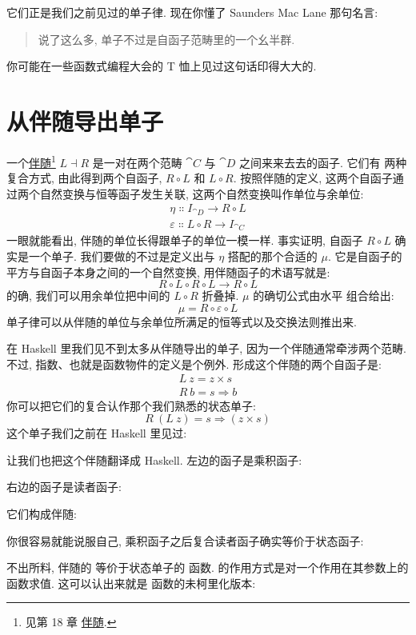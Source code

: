 \noindent
它们正是我们之前见过的单子律. 现在你懂了 Saunders Mac Lane 那句名言:

\begin{quote}
  说了这么多, 单子不过是自函子范畴里的一个幺半群.
\end{quote}
你可能在一些函数式编程大会的 T 恤上见过这句话印得大大的.

\section{从伴随导出单子}

一个\hyperref[adjunctions]{伴随}\footnote{见第 18 章 \hyperref[adjunctions]{伴随}.}
$L \dashv R$ 是一对在两个范畴 $\cat{C}$ 与 $\cat{D}$ 之间来来去去的函子. 它们有
两种复合方式, 由此得到两个自函子, $R \circ L$ 和 $L \circ R$. 按照伴随的定义,
这两个自函子通过两个自然变换与恒等函子发生关联, 这两个自然变换叫作单位与余单位:
\begin{gather*}
  \eta \Colon I_{\cat{D}} \to R \circ L \\
  \varepsilon \Colon L \circ R \to I_{\cat{C}}
\end{gather*}
一眼就能看出, 伴随的单位长得跟单子的单位一模一样. 事实证明, 自函子
$R \circ L$ 确实是一个单子. 我们要做的不过是定义出与 $\eta$ 搭配的那个合适的
$\mu$. 它是自函子的平方与自函子本身之间的一个自然变换, 用伴随函子的术语写就是:
\[R \circ L \circ R \circ L \to R \circ L\]
的确, 我们可以用余单位把中间的 $L \circ R$ 折叠掉. $\mu$ 的确切公式由水平
组合给出:
\[\mu = R \circ \varepsilon \circ L\]
单子律可以从伴随的单位与余单位所满足的恒等式以及交换法则推出来.

在 Haskell 里我们见不到太多从伴随导出的单子, 因为一个伴随通常牵涉两个范畴. 不过,
指数、也就是函数物件的定义是个例外. 形成这个伴随的两个自函子是:
\begin{gather*}
  L\ z = z\times{}s \\
  R\ b = s \Rightarrow b
\end{gather*}
你可以把它们的复合认作那个我们熟悉的状态单子:
\[R\ (L\ z) = s \Rightarrow (z\times{}s)\]
这个单子我们之前在 Haskell 里见过:

让我们也把这个伴随翻译成 Haskell. 左边的函子是乘积函子:

右边的函子是读者函子:

它们构成伴随:

你很容易就能说服自己, 乘积函子之后复合读者函子确实等价于状态函子:

不出所料, 伴随的  等价于状态单子的  函数.
 的作用方式是对一个作用在其参数上的函数求值. 这可以认出来就是
 函数的未柯里化版本:

